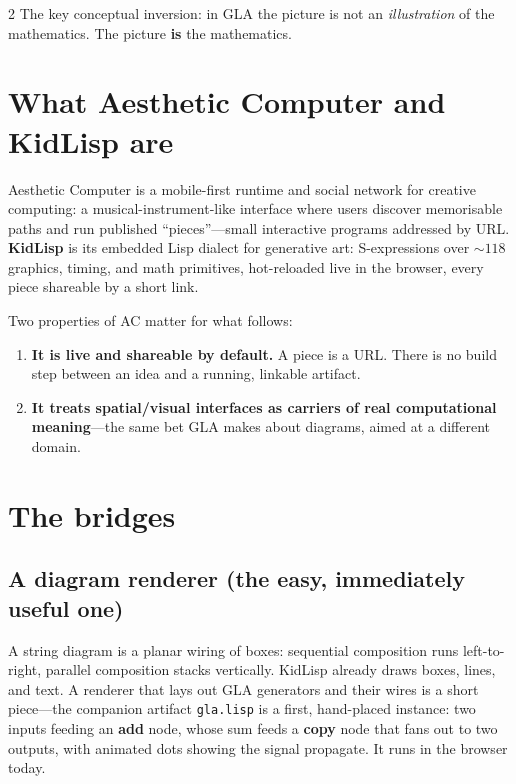 \documentclass[11pt, letterpaper]{article}
\begin{document}
\begin{multicols}{2}
The key conceptual inversion: in GLA the picture is not an
\emph{illustration} of the mathematics. The picture \textbf{is} the
mathematics.

\section{What Aesthetic Computer and KidLisp are}

Aesthetic Computer is a mobile-first runtime and social network for
creative computing: a musical-instrument-like interface where users
discover memorisable paths and run published ``pieces''---small
interactive programs addressed by URL. \textbf{KidLisp} is its embedded
Lisp dialect for generative art: S-expressions over ${\sim}118$ graphics,
timing, and math primitives, hot-reloaded live in the browser, every piece
shareable by a short link.

Two properties of AC matter for what follows:

\begin{enumerate}
  \item \textbf{It is live and shareable by default.} A piece is a URL.
    There is no build step between an idea and a running, linkable
    artifact.
  \item \textbf{It treats spatial/visual interfaces as carriers of real
    computational meaning}---the same bet GLA makes about diagrams, aimed
    at a different domain.
\end{enumerate}

\section{The bridges}

\subsection{A diagram renderer (the easy, immediately useful one)}

A string diagram is a planar wiring of boxes: sequential composition runs
left-to-right, parallel composition stacks vertically. KidLisp already
draws boxes, lines, and text. A renderer that lays out GLA generators and
their wires is a short piece---the companion artifact \texttt{gla.lisp}
is a first, hand-placed instance: two inputs feeding an \textbf{add}
node, whose sum feeds a \textbf{copy} node that fans out to two outputs,
with animated dots showing the signal propagate. It runs in the browser
today.


\end{multicols}
\end{document}
